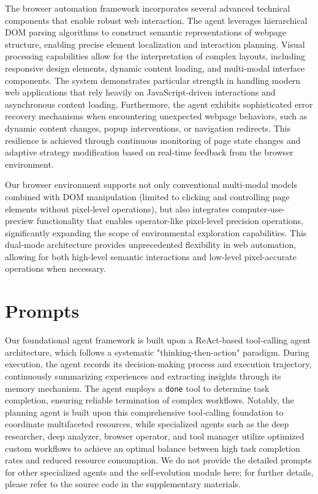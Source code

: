 \documentclass[11pt]{article}
\begin{document}
The browser automation framework incorporates several advanced technical components that enable robust web interaction. The agent leverages hierarchical DOM parsing algorithms to construct semantic representations of webpage structure, enabling precise element localization and interaction planning. Visual processing capabilities allow for the interpretation of complex layouts, including responsive design elements, dynamic content loading, and multi-modal interface components. The system demonstrates particular strength in handling modern web applications that rely heavily on JavaScript-driven interactions and asynchronous content loading. Furthermore, the agent exhibits sophisticated error recovery mechanisms when encountering unexpected webpage behaviors, such as dynamic content changes, popup interventions, or navigation redirects. This resilience is achieved through continuous monitoring of page state changes and adaptive strategy modification based on real-time feedback from the browser environment.

Our browser environment supports not only conventional multi-modal models combined with DOM manipulation (limited to clicking and controlling page elements without pixel-level operations), but also integrates computer-use-preview functionality that enables operator-like pixel-level precision operations, significantly expanding the scope of environmental exploration capabilities. This dual-mode architecture provides unprecedented flexibility in web automation, allowing for both high-level semantic interactions and low-level pixel-accurate operations when necessary.

\newpage
\section{Prompts}
\label{app_sec:prompts}

Our foundational agent framework is built upon a ReAct-based tool-calling agent architecture, which follows a systematic "thinking-then-action" paradigm. During execution, the agent records its decision-making process and execution trajectory, continuously summarizing experiences and extracting insights through its memory mechanism. The agent employs a \texttt{done} tool to determine task completion, ensuring reliable termination of complex workflows. Notably, the planning agent is built upon this comprehensive tool-calling foundation to coordinate multifaceted resources, while specialized agents such as the deep researcher, deep analyzer, browser operator, and tool manager utilize optimized custom workflows to achieve an optimal balance between high task completion rates and reduced resource consumption. We do not provide the detailed prompts for other specialized agents and the self-evolution module here; for further details, please refer to the source code in the supplementary materials. 
\end{document}

